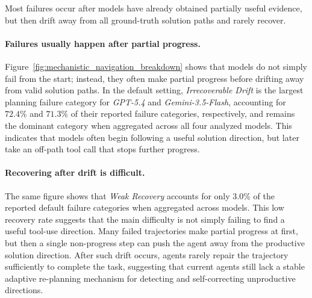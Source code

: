 \documentclass{llmxive}
\begin{document}


\begin{takeaway}
Most failures occur after models have already obtained partially useful evidence, but then drift away from all ground-truth solution paths and rarely recover.
\end{takeaway}

\paragraph{Failures usually happen after partial progress.}
Figure~\ref{fig:mechanistic_navigation_breakdown} shows that models do not simply fail from the start; instead, they often make partial progress before drifting away from valid solution paths.
In the default setting, \textit{Irrecoverable Drift} is the largest planning failure category for \textit{GPT-5.4} and \textit{Gemini-3.5-Flash}, accounting for $72.4\%$ and $71.3\%$ of their reported failure categories, respectively, and remains the dominant category when aggregated across all four analyzed models.
This indicates that models often begin following a useful solution direction, but later take an off-path tool call that stops further progress.

\paragraph{Recovering after drift is difficult.}
The same figure shows that \textit{Weak Recovery} accounts for only $3.0\%$ of the reported default failure categories when aggregated across models.
This low recovery rate suggests that the main difficulty is not simply failing to find a useful tool-use direction.
Many failed trajectories make partial progress at first, but then a single non-progress step can push the agent away from the productive solution direction.
After such drift occurs, agents rarely repair the trajectory sufficiently to complete the task, suggesting that current agents still lack a stable adaptive re-planning mechanism for detecting and self-correcting unproductive directions.
\end{document}

